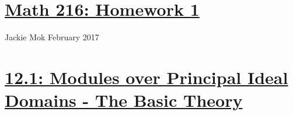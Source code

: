 \documentclass{article}
\begin{document}
\section*{\underline{Math 216: Homework 1}}
Jackie Mok
 February 2017

\section*{\underline{12.1: Modules over Principal Ideal Domains - The Basic Theory}}







\end{document}
